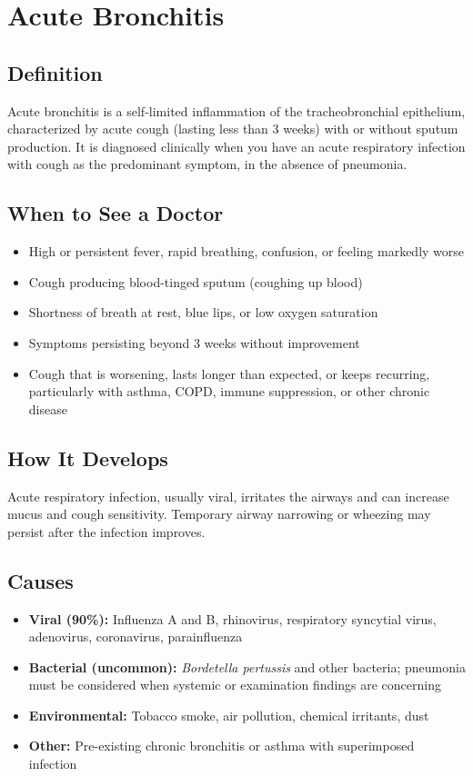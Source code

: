 \chapter{Acute Bronchitis}

\section*{Definition}
Acute bronchitis is a self-limited inflammation of the tracheobronchial epithelium, characterized by acute cough (lasting less than 3 weeks) with or without sputum production. It is diagnosed clinically when you have an acute respiratory infection with cough as the predominant symptom, in the absence of pneumonia.

\section*{When to See a Doctor}

\begin{itemize}
 \item High or persistent fever, rapid breathing, confusion, or feeling markedly worse
 \item Cough producing blood-tinged sputum (coughing up blood)
 \item Shortness of breath at rest, blue lips, or low oxygen saturation
 \item Symptoms persisting beyond 3 weeks without improvement
 \item Cough that is worsening, lasts longer than expected, or keeps recurring, particularly with asthma, COPD, immune suppression, or other chronic disease
\end{itemize}

\section*{How It Develops}
Acute respiratory infection, usually viral, irritates the airways and can increase mucus and cough sensitivity. Temporary airway narrowing or wheezing may persist after the infection improves.

\section*{Causes}
\begin{itemize}
 \item \textbf{Viral (90\%):} Influenza A and B, rhinovirus, respiratory syncytial virus, adenovirus, coronavirus, parainfluenza
 \item \textbf{Bacterial (uncommon):} \textit{Bordetella pertussis} and other bacteria; pneumonia must be considered when systemic or examination findings are concerning
 \item \textbf{Environmental:} Tobacco smoke, air pollution, chemical irritants, dust
 \item \textbf{Other:} Pre-existing chronic bronchitis or asthma with superimposed infection
\end{itemize}


